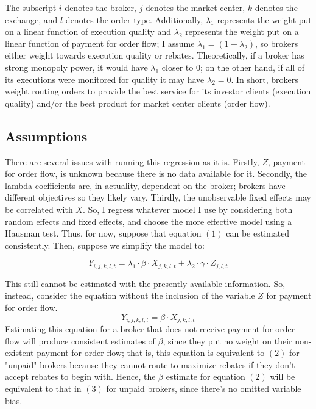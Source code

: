 \documentclass[12pt,a4paper]{article}
\begin{document}
		The subscript $i$ denotes the broker, $j$ denotes the market center, $k$ denotes the exchange, and $l$ denotes the order type. Additionally, $\lambda_1$ represents the weight put on a linear function of execution quality and $\lambda_2$ represents the weight put on a linear function of payment for order flow; I assume $\lambda_1 = (1-\lambda_2)$, so brokers either weight towards execution quality or rebates. Theoretically, if a broker has strong monopoly power, it would have $\lambda_1$ closer to $0$; on the other hand, if all of its executions were monitored for quality it may have $\lambda_2 = 0$. In short, brokers weight routing orders to provide the best service for its investor clients (execution quality) and/or the best product for market center clients (order flow).
	
	\subsection{Assumptions}	
		
		There are several issues with running this regression as it is. Firstly, $Z$, payment for order flow, is unknown because there is no data available for it. Secondly, the lambda coefficients are, in actuality, dependent on the broker; brokers have different objectives so they likely vary. Thirdly, the unobservable fixed effects may be correlated with $X$. So, I regress whatever model I use by considering both random effects and fixed effects, and choose the more effective model using a Hausman test. Thus, for now, suppose that equation $(1)$ can be estimated consistently. Then, suppose we simplify the model to:
		
		
		\begin{equation}
		Y_{i, j, k, l, t} = \lambda_1 \cdot \beta \cdot X_{j, k, l, t} + \lambda_2 \cdot \gamma \cdot Z_{j, l, t}
		\end{equation}
		
		This still cannot be estimated with the presently available information. So, instead, consider the equation without the inclusion of the variable $Z$ for payment for order flow. 
		\begin{equation}
		Y_{i, j, k, l, t} = \beta \cdot X_{j, k, l, t}
		\end{equation}
		Estimating this equation for a broker that does not receive payment for order flow will produce consistent estimates of $\beta$, since they put no weight on their non-existent payment for order flow; that is, this equation is equivalent to $(2)$ for "unpaid" brokers because they cannot route to maximize rebates if they don't accept rebates to begin with. Hence, the $\beta$ estimate for equation $(2)$ will be equivalent to that in $(3)$ for unpaid brokers, since there's no omitted variable bias. 
		
\end{document}
